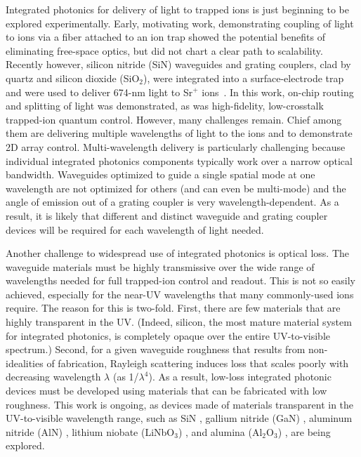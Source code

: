\documentclass[%
12pt,
 amsmath,amssymb,
]{revtex4-2}
\begin{document}
Integrated photonics for delivery of light to trapped ions is just beginning to be explored experimentally.  Early, motivating work, demonstrating coupling of light to ions via a fiber attached to an ion trap \cite{KimIntFiberTrap2011} showed the potential benefits of eliminating free-space optics, but did not chart a clear path to scalability.   Recently however, silicon nitride (SiN) waveguides and grating couplers, clad by quartz and silicon dioxide (SiO$_2$), were integrated into a surface-electrode trap and were used to deliver 674-nm light to Sr$^+$ ions~\cite{MehtaIntegrated2016}.  In this work, on-chip routing and splitting of light was demonstrated, as was high-fidelity, low-crosstalk trapped-ion quantum control.  However, many challenges remain. Chief among them are delivering multiple wavelengths of light to the ions and to demonstrate 2D array control.  Multi-wavelength delivery is particularly challenging because individual integrated photonics components typically work over a narrow optical bandwidth. Waveguides optimized to guide a single spatial mode at one wavelength are not optimized for others (and can even be multi-mode) and the angle of emission out of a grating coupler is very wavelength-dependent.  As a result, it is likely that different and distinct waveguide and grating coupler devices will be required for each wavelength of light needed.

Another challenge to widespread use of integrated photonics is optical loss.  The waveguide materials must be highly transmissive over the wide range of wavelengths needed for full trapped-ion control and readout.  This is not so easily achieved, especially for the near-UV wavelengths that many commonly-used ions require.  The reason for this is two-fold.  First, there are few materials that are highly transparent in the UV. (Indeed, silicon, the most mature material system for integrated photonics, is completely opaque over the entire UV-to-visible spectrum.)  Second, for a given waveguide roughness that results from non-idealities of fabrication, Rayleigh scattering induces loss that scales poorly with decreasing wavelength $\lambda$ (as 1/$\lambda^4$). As a result, low-loss integrated photonic devices must be developed using materials that can be fabricated with low roughness.  This work is ongoing, as devices made of materials transparent in the UV-to-visible wavelength range, such as SiN \cite{SoraceAgaskarSPIE2018}, gallium nitride (GaN) \cite{XiongGaN2011}, aluminum nitride (AlN) \cite{XiongAlN2012, LuAlN2018, LiuUVAlN2018}, lithium niobate (LiNbO$_3$) \cite{ZhangLiNbO32017}, and alumina (Al$_2$O$_3$) \cite{WestAl2O32018}, are being explored.
\end{document}
